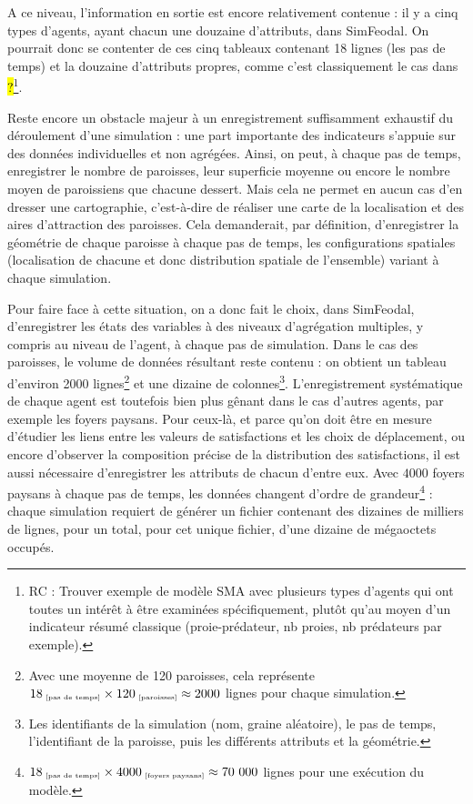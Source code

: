 	A ce niveau, l'information en sortie est encore relativement contenue : il y a cinq types d'agents, ayant chacun une douzaine d'attributs, dans SimFeodal. On pourrait donc se contenter de ces cinq tableaux contenant 18 lignes (les pas de temps) et la douzaine d'attributs propres, comme c'est classiquement le cas dans \hl{?}\footnote{
		RC : Trouver exemple de modèle SMA avec plusieurs types d'agents qui ont toutes un intérêt à être examinées spécifiquement, plutôt qu'au moyen d'un indicateur résumé classique (proie-prédateur, nb proies, nb prédateurs par exemple).
	}.

	Reste encore un obstacle majeur à un enregistrement suffisamment exhaustif du déroulement d'une simulation : une part importante des indicateurs s'appuie sur des données individuelles et non agrégées.
	Ainsi, on peut, à chaque pas de temps, enregistrer le nombre de paroisses, leur superficie moyenne ou encore le nombre moyen de paroissiens que chacune dessert.
	Mais cela ne permet en aucun cas d'en dresser une cartographie, c'est-à-dire de réaliser une carte de la localisation et des aires d'attraction des paroisses.
	Cela demanderait, par définition, d'enregistrer la géométrie de chaque paroisse à chaque pas de temps, les configurations spatiales (localisation de chacune et donc distribution spatiale de l'ensemble) variant à chaque simulation.


	Pour faire face à cette situation, on a donc fait le choix, dans SimFeodal, d'enregistrer les états des variables à des niveaux d'agrégation multiples, y compris au niveau de l'agent, à chaque pas de simulation. Dans le cas des paroisses, le volume de données résultant reste contenu : on obtient un tableau d'environ 2000 lignes\footnote{
	Avec une moyenne de 120 paroisses, cela représente $18_{\text{\tiny ~[pas de temps]}} \times 120_{\text{\tiny ~[paroisses]}} \approx 2000$ lignes pour chaque simulation.
	} et une dizaine de colonnes\footnote{
	Les identifiants de la simulation (nom, graine aléatoire), le pas de temps, l'identifiant de la paroisse, puis les différents attributs et la géométrie.
	}.
	L'enregistrement systématique de chaque agent est toutefois bien plus gênant dans le cas d'autres agents, par exemple les foyers paysans. Pour ceux-là, et parce qu'on doit être en mesure d'étudier les liens entre les valeurs de satisfactions et les choix de déplacement, ou encore d'observer la composition précise de la distribution des satisfactions, il est aussi nécessaire d'enregistrer les attributs de chacun d'entre eux. Avec $4000$ foyers paysans à chaque pas de temps, les données changent d'ordre de grandeur\footnote{
	$18_{\text{\tiny ~[pas de temps]}} \times 4000_{\text{\tiny ~[foyers paysans]}} \approx 70~000$ lignes pour une exécution du modèle.
	} : chaque simulation requiert de générer un fichier contenant des dizaines de milliers de lignes, pour un total, pour cet unique fichier, d'une dizaine de mégaoctets occupés.

